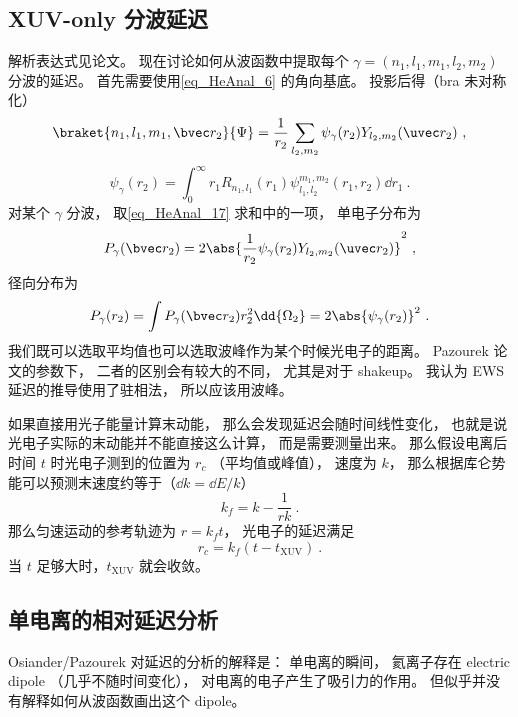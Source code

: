 \subsection{XUV-only 分波延迟}
解析表达式见论文。 现在讨论如何从波函数中提取每个 $\gamma = (n_1, l_1, m_1, l_2, m_2)$ 分波的延迟。 首先需要使用\autoref{eq_HeAnal_6} 的角向基底。 投影后得（bra 未对称化）
\begin{equation}\label{eq_HeAnal_17}
\braket{n_1,l_1,m_1,\bvec r_2}{\Psi} = \frac{1}{r_2} \sum_{l_2,m_2}\psi_\gamma(r_2) Y_{l_2,m_2}(\uvec r_2)~,
\end{equation}
\begin{equation}
\psi_\gamma(r_2) = \int_0^\infty r_1 R_{n_1,l_1}(r_1) \psi_{l_1,l_2}^{m_1,m_2}(r_1,r_2)\dd{r_1}~.
\end{equation}
对某个 $\gamma$ 分波， 取\autoref{eq_HeAnal_17} 求和中的一项， 单电子分布为
\begin{equation}
P_\gamma(\bvec r_2) = 2\abs{\frac{1}{r_2} \psi_\gamma(r_2) Y_{l_2,m_2}(\uvec r_2)}^2~,
\end{equation}
径向分布为
\begin{equation}\label{eq_HeAnal_16}
P_\gamma(r_2) = \int P_\gamma(\bvec r_2) r_2^2\dd{\Omega_2} = 2\abs{\psi_\gamma(r_2)}^2~.
\end{equation}
我们既可以选取平均值也可以选取波峰作为某个时候光电子的距离。 Pazourek 论文的参数下， 二者的区别会有较大的不同， 尤其是对于 shakeup。 我认为 EWS 延迟的推导使用了驻相法， 所以应该用波峰。 

如果直接用光子能量计算末动能， 那么会发现延迟会随时间线性变化， 也就是说光电子实际的末动能并不能直接这么计算， 而是需要测量出来。 那么假设电离后时间 $t$ 时光电子测到的位置为 $r_c$ （平均值或峰值）， 速度为 $k$， 那么根据库仑势能可以预测末速度约等于（$\dd{k} = \dd{E}/k$）
\begin{equation}
k_f = k - \frac{1}{rk}~.
\end{equation}
那么匀速运动的参考轨迹为 $r = k_f t$， 光电子的延迟满足
\begin{equation}
r_c = k_f(t - t_\text{XUV})~.
\end{equation}
当 $t$ 足够大时，$t_\text{XUV}$ 就会收敛。

\subsection{单电离的相对延迟分析}

Osiander/Pazourek 对延迟的分析的解释是： 单电离的瞬间， 氦离子存在 electric dipole （几乎不随时间变化）， 对电离的电子产生了吸引力的作用。 但似乎并没有解释如何从波函数画出这个 dipole。

